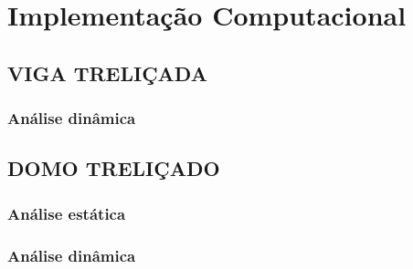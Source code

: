 \chapter{Implementação Computacional}


\section{VIGA TRELIÇADA}

\subsection{Análise dinâmica}

\section{DOMO TRELIÇADO}

\subsection{Análise estática}

\subsection{Análise dinâmica}
